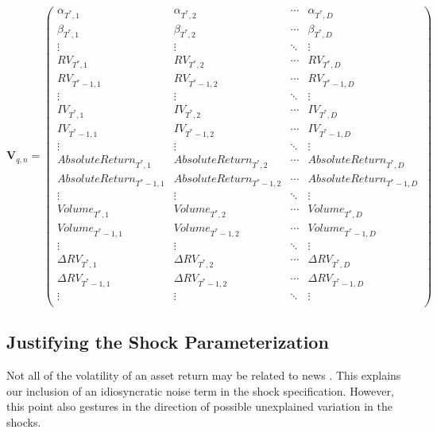 \documentclass[11pt]{article}
\theoremstyle{definition}
\begin{document}
    \begin{equation*}
      \textbf{V}_{q,n} = 
      \begin{pmatrix}
      \alpha_{T^{*},1} & \alpha_{T^{*},2}  & \cdots & \alpha_{T^{*},D}  \\
      \beta_{T^{*},1} & \beta_{T^{*},2}  & \cdots & \beta_{T^{*},D}  \\
      \vdots  & \vdots  & \ddots & \vdots  \\
      RV_{T^{*},1} & RV_{T^{*},2}  & \cdots & RV_{T^{*},D}  \\
      RV_{T^{*}-1,1}  & RV_{T^{*}-1,2}  & \cdots & RV_{T^{*}-1,D}  \\
      \vdots  & \vdots  & \ddots & \vdots  \\
      IV_{T^{*},1} & IV_{T^{*},2} & \cdots & IV_{T^{*},D} \\
      IV_{T^{*}-1,1}  & IV_{T^{*}-1,2}  & \cdots & IV_{T^{*}-1,D} \\
      \vdots  & \vdots  & \ddots & \vdots  \\
      AbsoluteReturn_{T^{*},1} & AbsoluteReturn_{T^{*},2} & \cdots & AbsoluteReturn_{T^{*},D} \\
      AbsoluteReturn_{T^{*}-1,1}  & AbsoluteReturn_{T^{*}-1,2}  & \cdots & AbsoluteReturn_{T^{*}-1,D} \\
      \vdots  & \vdots  & \ddots & \vdots  \\
      Volume_{T^{*},1}  & Volume_{T^{*},2}  & \cdots & Volume_{T^{*},D} \\
      Volume_{T^{*}-1,1}  & Volume_{T^{*}-1,2}  & \cdots & Volume_{T^{*}-1,D}  \\
      \vdots  & \vdots  & \ddots & \vdots  \\
      \Delta RV_{T^{*},1} & \Delta RV_{T^{*},2}  & \cdots & \Delta RV_{T^{*},D}  \\
      \Delta RV_{T^{*}-1,1}  & \Delta RV_{T^{*}-1,2}  & \cdots & \Delta RV_{T^{*}-1,D}  \\
      \vdots  & \vdots  & \ddots & \vdots  \\
      \end{pmatrix}
      \end{equation*}
   
    \subsection{Justifying the Shock Parameterization}
 
    Not all of the volatility of an asset return may be related to news \citep{boudoukh2019information}.  This explains our inclusion of an idiosyncratic noise term in the shock specification.  However, this point also gestures in the direction of possible unexplained variation in the shocks.
    
\end{document}
